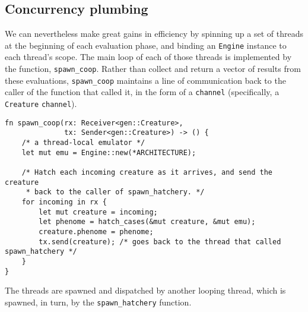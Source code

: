 \documentclass[11pt]{article}
\begin{document}
\subsection{Concurrency plumbing}
\label{sec:org681376b}
\label{org6f6b7f4}

We can nevertheless make great gains in efficiency by spinning
up a set of threads at the beginning of each evaluation phase,
and binding an \texttt{Engine} instance to each thread's scope. The 
main loop of each of those threads is implemented by the function,
\texttt{spawn\_coop}. Rather than collect and return a vector of results
from these evaluations, \texttt{spawn\_coop} maintains a line of communication
back to the caller of the function that called it, in the form of
a \texttt{channel} (specifically, a \texttt{Creature} \texttt{channel}). 

\lstset{language=rust,label=org39966cb,caption= ,captionpos=b,numbers=none}
\begin{lstlisting}
fn spawn_coop(rx: Receiver<gen::Creature>, 
              tx: Sender<gen::Creature>) -> () {
    /* a thread-local emulator */
    let mut emu = Engine::new(*ARCHITECTURE);

    /* Hatch each incoming creature as it arrives, and send the creature
     * back to the caller of spawn_hatchery. */
    for incoming in rx {
        let mut creature = incoming;
        let phenome = hatch_cases(&mut creature, &mut emu);
        creature.phenome = phenome;
        tx.send(creature); /* goes back to the thread that called spawn_hatchery */
    }
}
\end{lstlisting}

The threads are spawned and dispatched by another looping
thread, which is spawned, in turn, by the \texttt{spawn\_hatchery} function.
\end{document}

